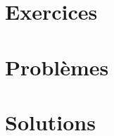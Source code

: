 \documentclass[11pt]{article}
\begin{document}
\section{Exercices}\label{sec:exercices}


\section{Problèmes}\label{sec:problemes}


\ifsolutions
\clearpage
\section{Solutions}\label{sec:solutions}

\fi
\end{document}

